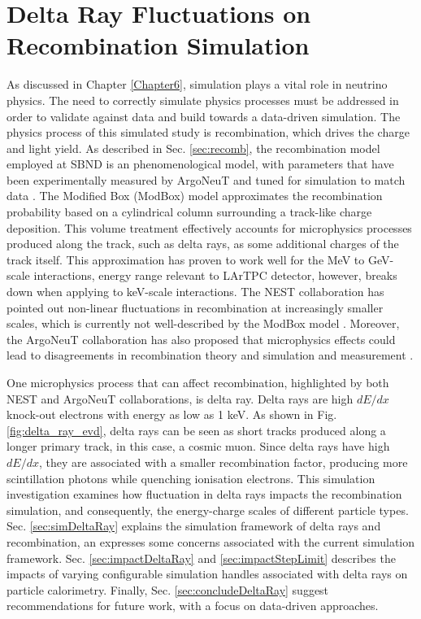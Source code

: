 \section{Delta Ray Fluctuations on Recombination Simulation}

As discussed in Chapter \ref{Chapter6}, simulation plays a vital role in neutrino physics.
The need to correctly simulate physics processes must be addressed in order to validate against data and build towards a data-driven simulation.
The physics process of this simulated study is recombination, which drives the charge and light yield.
As described in Sec. \ref{sec:recomb}, the recombination model employed at SBND is an phenomenological model, with parameters that have been experimentally measured by ArgoNeuT and tuned for simulation to match data \cite{argoneut_recomb}.
The Modified Box (ModBox) model approximates the recombination probability based on a cylindrical column surrounding a track-like charge deposition.
This volume treatment effectively accounts for microphysics processes produced along the track, such as delta rays, as some additional charges of the track itself.
This approximation has proven to work well for the MeV to GeV-scale interactions, energy range relevant to LArTPC detector, however, breaks down when applying to keV-scale interactions.
The NEST collaboration has pointed out non-linear fluctuations in recombination at increasingly smaller scales, which is currently not well-described by the ModBox model \cite{NEST}. 
Moreover, the ArgoNeuT collaboration has also proposed that microphysics effects could lead to disagreements in recombination theory and simulation and measurement \cite{argoneut_recomb}.

One microphysics process that can affect recombination, highlighted by both NEST and ArgoNeuT collaborations, is delta ray.
Delta rays are high $dE/dx$ knock-out electrons with energy as low as 1 keV.
As shown in Fig. \ref{fig:delta_ray_evd}, delta rays can be seen as short tracks produced along a longer primary track, in this case, a cosmic muon.
Since delta rays have high $dE/dx$, they are associated with a smaller recombination factor, producing more scintillation photons  while quenching ionisation electrons.
This simulation investigation examines how fluctuation in delta rays impacts the recombination simulation, and consequently, the energy-charge scales of different particle types.
Sec. \ref{sec:simDeltaRay} explains the simulation framework of delta rays and recombination, an expresses some concerns associated with the current simulation framework.
Sec. \ref{sec:impactDeltaRay} and \ref{sec:impactStepLimit} describes the impacts of varying configurable simulation handles associated with delta rays on particle calorimetry.
Finally, Sec. \ref{sec:concludeDeltaRay} suggest recommendations for future work, with a focus on data-driven approaches.

